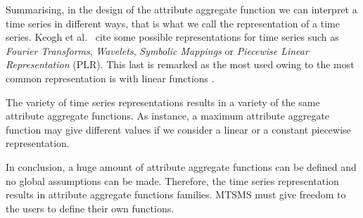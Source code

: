 
Summarising, in the design of the attribute aggregate function we can
interpret a time series in different ways, that is what we call the
representation of a time series. Keogh et al.\ \cite{last:keogh} cite
some possible representations for time series such as \emph{Fourier
  Transforms}, \emph{Wavelets}, \emph{Symbolic Mappings} or
\emph{Piecewise Linear Representation} (PLR). This last is remarked as
the most used owing to the most common representation is with linear
functions \cite{keogh01}.

The variety of time series representations results in a variety of the
same attribute aggregate functions. As instance, a maximum attribute
aggregate function may give different values if we consider a linear
or a constant piecewise representation. 

In conclusion, a huge amount of attribute aggregate functions can be
defined and no global assumptions can be made.  Therefore, the time
series representation results in attribute aggregate functions
families.  MTSMS must give freedom to the users to define their own
functions.









